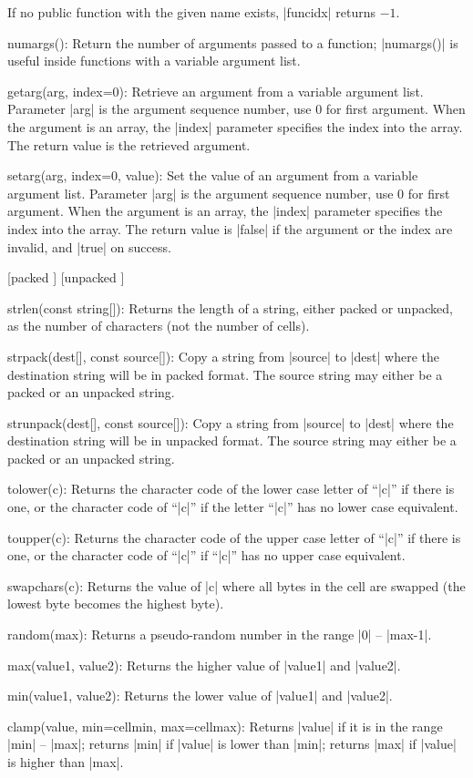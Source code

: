   If no public function with the given name exists, |funcidx| returns $-1$.

\dingbatseparator

\item numargs():
  Return the number of arguments passed to a function; |numargs()| is useful
  inside functions with a variable argument list.
\item getarg(arg, index=0):
  Retrieve an argument from a variable argument list. Parameter |arg| is the
  argument sequence number, use 0 for first argument. When the argument is an
  array, the |index| parameter specifies the index into the array. The return
  value is the retrieved argument.
\item setarg(arg, index=0, value):
  Set the value of an argument from a variable argument list. Parameter |arg| is
  the argument sequence number, use 0 for first argument. When the
  argument is an array, the |index| parameter specifies the index into the
  array. The return value is |false| if the argument or the index are invalid,
  and |true| on success.

\dingbatseparator

  [packed \midtilde] [unpacked \midtilde]
\item strlen(const string[]):
  Returns the length of a string, either packed or unpacked, as the number
  of characters (not the number of cells).
\item strpack(dest[], const source[]):
  Copy a string from |source| to |dest| where the destination string will
  be in packed format. The source string may either be a packed or an
  unpacked string.
\item strunpack(dest[], const source[]):
  Copy a string from |source| to |dest| where the destination string will
  be in unpacked format. The source string may either be a packed or an
  unpacked string.
\item tolower(c):
  Returns the character code of the lower case letter of ``|c|'' if there is
  one, or the character code of ``|c|'' if the letter ``|c|'' has no lower
  case equivalent.
\item toupper(c):
  Returns the character code of the upper case letter of ``|c|'' if there is
  one, or the character code of ``|c|'' if ``|c|'' has no upper case
  equivalent.

\dingbatseparator

\item swapchars(c):
  Returns the value of |c| where all bytes in the cell are swapped (the lowest
  byte becomes the highest byte).
\item random(max):
  Returns a pseudo-random number in the range |0| -- |max-1|.
\item max(value1, value2):
  Returns the higher value of |value1| and |value2|.
\item min(value1, value2):
  Returns the lower value of |value1| and |value2|.
\item clamp(value, min=cellmin, max=cellmax):
  Returns |value| if it is in the range |min| -- |max|; returns |min| if
  |value| is lower than |min|; returns |max| if |value| is higher than |max|.

